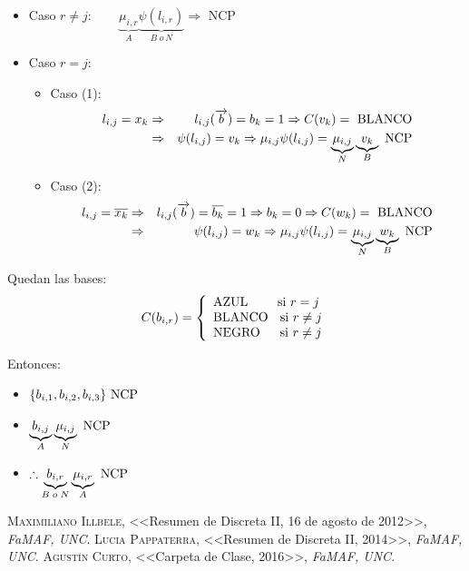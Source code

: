 \documentclass[12pt,a4paper]{report}
\newcounter{neq}
\begin{document}
		\begin{itemize}
			\item Caso $r \neq j : \qquad \underbrace{\mu_{i, r}}_{A} \underbrace{\psi(l_{i, r})}_{B \; o \, N} \Rightarrow$ NCP
			\item Caso $r = j$:
				\begin{itemize}
			\item Caso (1):
				\begin{eqnarray}
						\nonumber l_{i, j} = x_{k} &\Rightarrow & l_{i, j}(\overrightarrow{b}) = b_{k} = 1 \Rightarrow C(v_{k}) = \textup{ BLANCO} \\
						\nonumber &\Rightarrow& \psi(l_{i, j}) = v_{k}	\Rightarrow \mu_{i, j} \psi(l_{i, j}) = \underbrace{\mu_{i, j}}_{N} \underbrace{v_{k}}_{B} \textup{ NCP}
				\end{eqnarray}

			\item Caso (2):
				\begin{eqnarray}
						\nonumber l_{i, j} = \overline{x_{k}} &\Rightarrow & l_{i, j}(\overrightarrow{b}) = \overline{b_{k}} = 1 \Rightarrow b_{k} = 0 \Rightarrow C(w_{k}) = \textup{ BLANCO} \\
						\nonumber &\Rightarrow& \psi(l_{i, j}) = w_{k}	\Rightarrow \mu_{i, j} \psi(l_{i, j}) = \underbrace{\mu_{i, j}}_{N} \underbrace{w_{k}}_{B} \textup{ NCP}
				\end{eqnarray}
			\end{itemize}
		\end{itemize}

	\par Quedan las bases:
		\begin{equation*}
			C(b_{i, r}) =
		  	\left\lbrace
  			\begin{array}{l}
    		 	\textup{AZUL \qquad si } r = j \\
    		 	\textup{BLANCO \; si } r \neq j \\
    		 	\textup{NEGRO \; \; si } r \neq j
  			\end{array}
 			\right.
		\end{equation*}

	Entonces:
	\begin{itemize}
		\item $\lbrace b_{i, 1}, b_{i, 2}, b_{i, 3} \rbrace \textup{ NCP}$
 		\item $\underbrace{b_{i, j}}_{A} \underbrace{\mu_{i, j}}_{N} \textup{ NCP}$
 		\item $\therefore \underbrace{b_{i, r}}_{B \; o \; N} \underbrace{\mu_{i, r}}_{A} \textup{ NCP}$
	\end{itemize}



\begin{thebibliography}{X}
 \textsc{Maximiliano Illbele},
<<Resumen de Discreta II, 16 de agosto de 2012>>,
\textit{FaMAF, UNC}.
 \textsc{Lucia Pappaterra},
<<Resumen de Discreta II, 2014>>,
\textit{FaMAF, UNC}.
 \textsc{Agustín Curto},
<<Carpeta de Clase, 2016>>,
\textit{FaMAF, UNC}.
\end{thebibliography}
\end{document}
